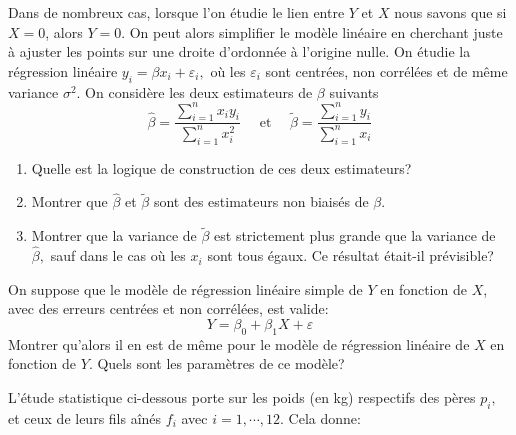\documentclass{td_um}
\providecommand{\1}{\mathds{1}}
\begin{document}
\exo{}
Dans de nombreux cas, lorsque l'on étudie le lien entre $Y$ et $X$ nous savons que si $X=0$, alors $Y=0$. On peut alors simplifier le modèle linéaire en cherchant juste à ajuster les points sur une droite d'ordonnée à l'origine nulle. On étudie la régression linéaire $y_{i}=\beta x_{i}+\varepsilon_{i},$ où les $\varepsilon_{i}$ sont centrées, non corrélées et de même variance $\sigma^{2}$. On considère les deux estimateurs de $\beta$ suivants
\[
\hat{\beta}=\frac{\sum_{i=1}^{n} x_{i} y_{i}}{\sum_{i=1}^{n} x_{i}^{2}} \quad \text { et } \quad \tilde{\beta}=\frac{\sum_{i=1}^{n} y_{i}}{\sum_{i=1}^{n} x_{i}}
\]
\begin{enumerate}
    \item  Quelle est la logique de construction de ces deux estimateurs?
    \item   Montrer que $\hat{\beta}$ et $\tilde{\beta}$ sont des estimateurs non biaisés de $\beta$.
    \item   Montrer que la variance de $\tilde{\beta}$ est strictement plus grande que la variance de
        $\hat{\beta},$ sauf dans le cas où les $x_{i}$ sont tous égaux. Ce résultat était-il prévisible?
\end{enumerate}

\exo{}
On suppose que le modèle de régression linéaire simple de $Y$ en fonction de $X$, avec des erreurs centrées et non corrélées, est valide:
\[
Y=\beta_{0}+\beta_{1} X+\varepsilon
\]
Montrer qu'alors il en est de même pour le modèle de régression linéaire de $X$ en fonction de $Y$. Quels sont les paramètres de ce modèle?

\exo{}
L'étude statistique ci-dessous porte sur les poids (en kg) respectifs des pères $p_{i},$ et ceux de leurs fils aînés $f_{i}$ avec $i=1,\cdots,12$. Cela donne:

\begin{center}
\end{center}
\end{document}
